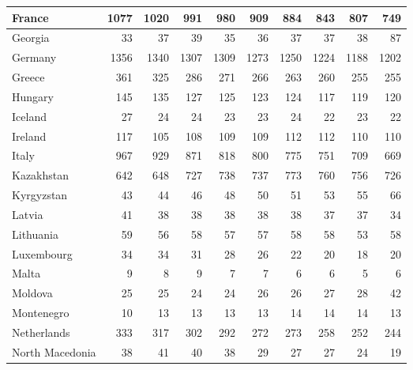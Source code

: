 \begin{table}
\begin{tabular}{|l|r|r|r|r|r|r|r|r|r|}
                        France&   1077&   1020&    991&    980&    909&    884&    843&    807&    749\\\hline
                       Georgia&     33&     37&     39&     35&     36&     37&     37&     38&     87\\\hline
                       Germany&   1356&   1340&   1307&   1309&   1273&   1250&   1224&   1188&   1202\\\hline
                        Greece&    361&    325&    286&    271&    266&    263&    260&    255&    255\\\hline
                       Hungary&    145&    135&    127&    125&    123&    124&    117&    119&    120\\\hline
                       Iceland&     27&     24&     24&     23&     23&     24&     22&     23&     22\\\hline
                       Ireland&    117&    105&    108&    109&    109&    112&    112&    110&    110\\\hline
                         Italy&    967&    929&    871&    818&    800&    775&    751&    709&    669\\\hline
                    Kazakhstan&    642&    648&    727&    738&    737&    773&    760&    756&    726\\\hline
                    Kyrgyzstan&     43&     44&     46&     48&     50&     51&     53&     55&     66\\\hline
                        Latvia&     41&     38&     38&     38&     38&     38&     37&     37&     34\\\hline
                     Lithuania&     59&     56&     58&     57&     57&     58&     58&     53&     58\\\hline
                    Luxembourg&     34&     34&     31&     28&     26&     22&     20&     18&     20\\\hline
                         Malta&      9&      8&      9&      7&      7&      6&      6&      5&      6\\\hline
                       Moldova&     25&     25&     24&     24&     26&     26&     27&     28&     42\\\hline
                    Montenegro&     10&     13&     13&     13&     13&     14&     14&     14&     13\\\hline
                   Netherlands&    333&    317&    302&    292&    272&    273&    258&    252&    244\\\hline
               North Macedonia&     38&     41&     40&     38&     29&     27&     27&     24&     19\\\hline

\end{tabular}
\end{table}
